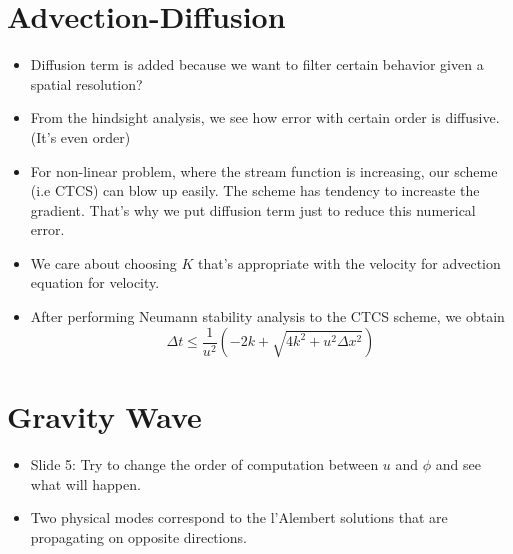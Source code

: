 \documentclass{article}
\begin{document}
\section{Advection-Diffusion}
\begin{itemize}
    \item Diffusion term is added because we want to filter certain behavior given a spatial resolution?
    \item From the hindsight analysis, we see how error with certain order is diffusive. (It's even order)
    \item For non-linear problem, where the stream function is increasing, our scheme (i.e CTCS) can blow up easily. The scheme has tendency to increaste the gradient. That's why we put diffusion term just to reduce this numerical error.
    \item We care about choosing $K$ that's appropriate with the velocity for advection equation for velocity.
    \item After performing Neumann stability analysis to the CTCS scheme, we obtain
    \[ \Delta t \leq \frac{1}{u^2} (-2k + \sqrt{4k^2 + u^2\Delta x^2}) \]
\end{itemize}


\section{Gravity Wave}
\begin{itemize}
    \item Slide 5: Try to change the order of computation between $u$ and $\phi$ and see what will happen.
    \item Two physical modes correspond to the l'Alembert solutions that are propagating on opposite directions.
\end{itemize}
\end{document}
